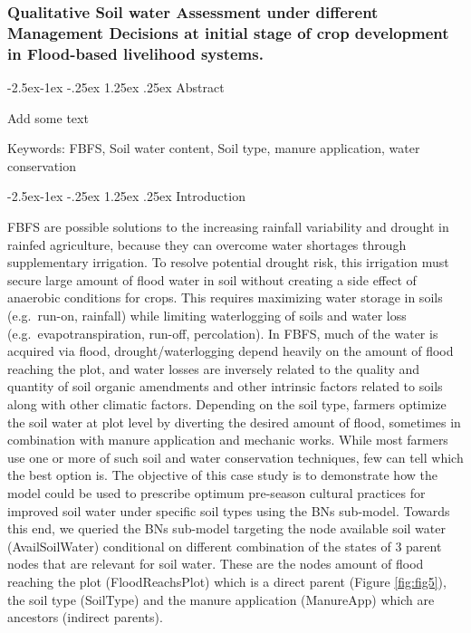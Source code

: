 \documentclass[12pt,oneside]{article}
\makeatletter
\renewcommand\paragraph{\@startsection{paragraph}{4}{\z@}%
            {-2.5ex\@plus -1ex \@minus -.25ex}%
            {1.25ex \@plus .25ex}%
            {\normalfont\normalsize\bfseries}}
\makeatother
\begin{document}
\hypertarget{IV21}{%
\subsubsection{Qualitative Soil water Assessment under different Management Decisions at initial stage of crop development in Flood-based livelihood systems.}\label{IV21}}

\hypertarget{IV210}{%
\paragraph{Abstract}\label{IV210}}

Add some text

Keywords: FBFS, Soil water content, Soil type, manure application, water conservation

\hypertarget{IV211}{%
\paragraph{Introduction}\label{IV211}}

FBFS are possible solutions to the increasing rainfall variability and drought in rainfed agriculture, because they can overcome water shortages through supplementary irrigation. To resolve potential drought risk, this irrigation must secure large amount of flood water in soil without creating a side effect of anaerobic conditions for crops. This requires maximizing water storage in soils (e.g.~run-on, rainfall) while limiting waterlogging of soils and water loss (e.g.~evapotranspiration, run-off, percolation). In FBFS, much of the water is acquired via flood, drought/waterlogging depend heavily on the amount of flood reaching the plot, and water losses are inversely related to the quality and quantity of soil organic amendments and other intrinsic factors related to soils along with other climatic factors. Depending on the soil type, farmers optimize the soil water at plot level by diverting the desired amount of flood, sometimes in combination with manure application and mechanic works. While most farmers use one or more of such soil and water conservation techniques, few can tell which the best option is. The objective of this case study is to demonstrate how the model could be used to prescribe optimum pre-season cultural practices for improved soil water under specific soil types using the BNs sub-model. Towards this end, we queried the BNs sub-model targeting the node available soil water (AvailSoilWater) conditional on different combination of the states of 3 parent nodes that are relevant for soil water. These are the nodes amount of flood reaching the plot (FloodReachsPlot) which is a direct parent (Figure \ref{fig:fig5}), the soil type (SoilType) and the manure application (ManureApp) which are ancestors (indirect parents).
\end{document}
